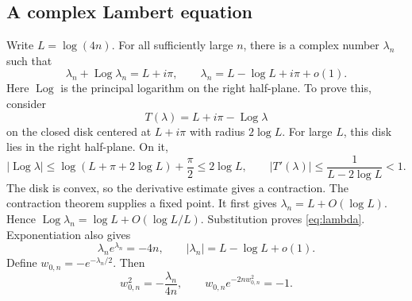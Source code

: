 \documentclass[11pt,a4paper]{article}
\newcommand{\Log}{\operatorname{Log}}
\begin{document}
\subsection{A complex Lambert equation}
Write $L=\log(4n)$. For all sufficiently large $n$, there is a complex number
$\lambda_n$ such that
\begin{equation}\label{eq:lambda}
 \lambda_n+\Log\lambda_n=L+i\pi,\qquad
 \lambda_n=L-\log L+i\pi+o(1).
\end{equation}
Here $\Log$ is the principal logarithm on the right half-plane.
To prove this, consider
\[
 T(\lambda)=L+i\pi-\Log\lambda
\]
on the closed disk centered at $L+i\pi$ with radius $2\log L$.
For large $L$, this disk lies in the right half-plane. On it,
\[
 |\Log\lambda|\le\log(L+\pi+2\log L)+\frac\pi2\le2\log L,
 \qquad |T'(\lambda)|\le\frac1{L-2\log L}<1.
\]
The disk is convex, so the derivative estimate gives a contraction.
The contraction theorem supplies a fixed point. It first gives
$\lambda_n=L+O(\log L)$. Hence
$\Log\lambda_n=\log L+O(\log L/L)$.
Substitution proves \eqref{eq:lambda}. Exponentiation also gives
\[
 \lambda_ne^{\lambda_n}=-4n,\qquad
 |\lambda_n|=L-\log L+o(1).
\]
Define $w_{0,n}=-e^{-\lambda_n/2}$. Then
\begin{equation}\label{eq:wzero}
 w_{0,n}^2=-\frac{\lambda_n}{4n},\qquad
 w_{0,n}e^{-2nw_{0,n}^2}=-1.
\end{equation}
\end{document}
